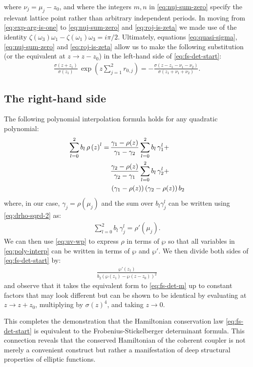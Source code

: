 \documentclass[11pt,a4paper]{article}
\numberwithin{equation}{section}
\begin{document}
where $\nu_j=\mu_j-z_0$, and where the integers $m,n$ in \eqref{eq:nuj-sum-zero} specify the relevant lattice point rather than arbitrary independent periods.
In moving from \eqref{eq:exp-arg-is-one} to \eqref{eq:nuj-sum-zero} and \eqref{eq:roj-is-zeta} we made use of the identity $\zeta{\left({\omega}_{3}\right)} {\omega}_{1} - \zeta{\left({\omega}_{1}\right)} {\omega}_{3} = i \pi /2$. 
Ultimately, equations \eqref{eq:quasi-sigma}, \eqref{eq:nuj-sum-zero} and \eqref{eq:roj-is-zeta} allow us to make the following substitution (or the equivalent at $z\rightarrow z - z_0$) in the left-hand side of \eqref{eq:fs-det-start}:
\begin{align}
\frac{\sigma{\left(z + z_1 \right)}}{\sigma{\left(z_1 \right)}}\,\exp{\left(z \sum\limits_{j=1}^{2} {r}_{0,j}\right)} = - \frac{\sigma{\left(z - z_1 - {\nu}_{1} - {\nu}_{2}\right)}}{\sigma{\left(z_1 + {\nu}_{1} + {\nu}_{2}\right)}}.
\end{align}

\subsection{The right-hand side}
The following polynomial interpolation formula holds for any quadratic polynomial:
\begin{align}
\sum_{l=0}^{2}b_l\,\rho\left(z\right)^l =\, &\frac{{\gamma}_{1} - \rho{\left(z \right)} }{{\gamma}_{1} - {\gamma}_{2}} \sum\limits_{l=0}^{2}b_l\,\gamma_1^l + \notag \\
&\frac{{\gamma}_{2} - \rho{\left(z \right)} }{{\gamma}_{2} - {\gamma}_{1}} \sum\limits_{l=0}^{2}b_l\,\gamma_2^l + \notag \\
&\left({\gamma}_{1} - \rho{\left(z \right)}\right) \left({\gamma}_{2} - \rho{\left(z \right)}\right) b_2 \label{eq:poly-interp}
\end{align}
where, in our case, $\gamma_j=\rho(\mu_j)$ and the sum over $b_l \gamma_j^l$ can be written using \eqref{eq:drho-sqrd-2} as:
\begin{align}
\sum\limits_{l=0}^{2}b_l\,\gamma_j^l = \rho'\left(\mu_j\right).
\end{align}
We can then use \eqref{eq:uv-wp} to express $\rho$ in terms of $\wp$ so that all variables in \eqref{eq:poly-interp} can be written in terms of $\wp$ and $\wp'$. 
We then divide both sides of \eqref{eq:fs-det-start} by:
\begin{align}
\frac{\wp'{\left(z_{1}\right)}}{b_2 \left(\wp{\left(z_{1}\right)} - \wp{\left(z - z_{0}\right)}\right)^2 }
\end{align}
and observe that it takes the equivalent form to \eqref{eq:fs-det-m} up to constant factors that may look different but can be shown to be identical by evaluating at $z\rightarrow z + z_0$, multiplying by $\sigma(z)^4$, and taking $z\rightarrow 0$.

This completes the demonstration that the Hamiltonian conservation law \eqref{eq:fs-det-start} is equivalent to the Frobenius-Stickelberger determinant formula.
This connection reveals that the conserved Hamiltonian of the coherent coupler is not merely a convenient construct but rather a manifestation of deep structural properties of elliptic functions.


\printbibliography
\end{document}
